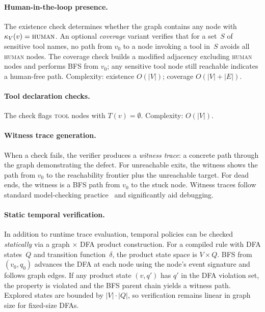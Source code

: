 \paragraph{Human-in-the-loop presence.}
The existence check determines whether the graph contains any node with
$\kappa_V(v) = \textsc{human}$.  An optional \emph{coverage} variant
verifies that for a set~$S$ of sensitive tool names, no path from $v_0$ to
a node invoking a tool in~$S$ avoids all \textsc{human} nodes.  The
coverage check builds a modified adjacency excluding \textsc{human} nodes
and performs BFS from $v_0$; any sensitive tool node still reachable
indicates a human-free path.
Complexity: existence $O(|V|)$; coverage $O(|V| + |E|)$.

\paragraph{Tool declaration checks.}
The check flags \textsc{tool} nodes with $T(v) = \emptyset$.
Complexity: $O(|V|)$.

\paragraph{Witness trace generation.}
When a check fails, the verifier produces a \emph{witness trace}: a
concrete path through the graph demonstrating the defect. For
unreachable exits, the witness shows the path from $v_0$ to the
reachability frontier plus the unreachable target. For dead ends, the
witness is a BFS path from $v_0$ to the stuck node. Witness traces
follow standard model-checking practice~\citep{clarke1999modelchecking}
and significantly aid debugging.

\paragraph{Static temporal verification.}
In addition to runtime trace evaluation, temporal policies can be checked
\emph{statically} via a graph $\times$ DFA product construction.  For a
compiled rule with DFA states~$Q$ and transition function~$\delta$, the
product state space is $V \times Q$.  BFS from $(v_0, q_0)$ advances the
DFA at each node using the node's event signature and follows graph edges.
If any product state $(v, q')$ has $q'$ in the DFA violation set, the
property is violated and the BFS parent chain yields a witness path.
Explored states are bounded by $|V| \cdot |Q|$, so verification remains
linear in graph size for fixed-size DFAs.

